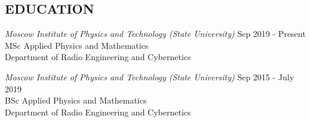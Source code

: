 \documentclass[margin, 10pt]{res} %
\begin{document}
\begin{resume}

 
\section{EDUCATION}

{\sl Moscow Institute of Physics and Technology (State University)} \hfill Sep 2019 - Present \\
MSc Applied Physics and Mathematics\\
Department of Radio Engineering and Cybernetics


{\sl Moscow Institute of Physics and Technology (State University)} \hfill Sep 2015 - July 2019 \\
BSc Applied Physics and Mathematics\\
Department of Radio Engineering and Cybernetics\\





\end{resume}
\end{document}
